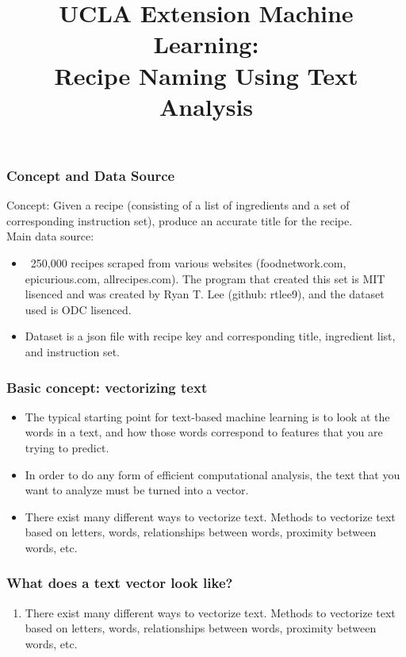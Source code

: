 \documentclass{beamer}
\title{UCLA Extension Machine Learning:\\
	Recipe Naming Using Text Analysis}
\begin{document}
\begin{frame}
\titlepage
\end{frame}


\begin{frame}
	\frametitle{Concept and Data Source}

	Concept: Given a recipe (consisting of a list of ingredients and a set
	of corresponding instruction set), produce an accurate title for the
	recipe.\\
	\medskip
	Main data source:
	\begin{itemize}
		\item ~250,000 recipes scraped from various websites
			(foodnetwork.com, epicurious.com, allrecipes.com). The
			program that created this set is MIT lisenced and was
			created by Ryan T. Lee (github: rtlee9), and the
			dataset used is ODC lisenced.
			
		\item Dataset is a json file with recipe key and corresponding
			title, ingredient list, and instruction set.
	\end{itemize}
\end{frame}
			

\begin{frame}
	\frametitle{Basic concept: vectorizing text}
	\begin{itemize}
		\item The typical starting point for text-based machine
			learning is to look at the words in a text, and how
			those words correspond to features that you are trying
			to predict.
		\item In order to do any form of efficient computational
			analysis, the text that you want to analyze must be
			turned into a vector. 
		\item There exist many different ways to vectorize text.
			Methods to vectorize text based on letters, words,
			relationships between words, proximity between words,
			etc.

	\end{itemize}
\end{frame}

\begin{frame}

	\frametitle{What does a text vector look like?}
	\begin{enumerate}
	
		\item There exist many different ways to vectorize text.
			Methods to vectorize text based on letters, words,
			relationships between words, proximity between words,
			etc.

	\end{enumerate}
\end{frame}
\end{document}
